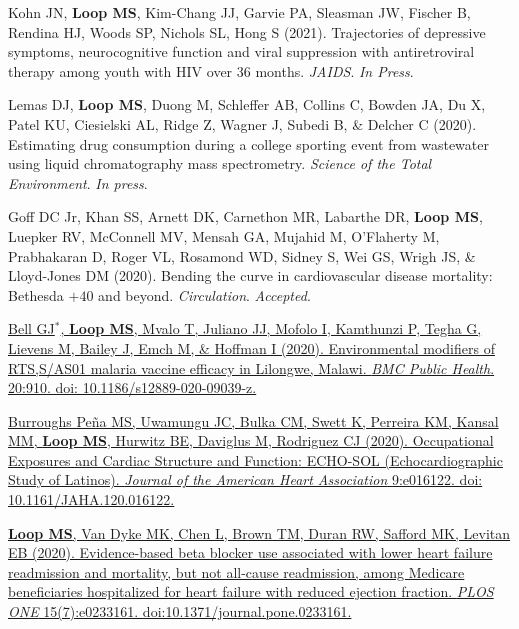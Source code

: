 \documentclass[10pt,letterpaper]{article}
\begin{document}
\begin{etaremune}

\item Kohn JN, \textbf{Loop MS}, Kim-Chang JJ, Garvie PA, Sleasman JW, Fischer B, Rendina HJ, Woods SP, Nichols SL, Hong S (2021). Trajectories of depressive symptoms, neurocognitive function and viral suppression with antiretroviral therapy among youth with HIV over 36 months. \emph{JAIDS}. \emph{In Press}.

\item Lemas DJ, \textbf{Loop MS}, Duong M, Schleffer AB, Collins C, Bowden JA, Du X, Patel KU, Ciesielski AL, Ridge Z, Wagner J, Subedi B, \& Delcher C (2020). Estimating drug consumption during a college sporting event from wastewater using liquid chromatography mass spectrometry. \emph{Science of the Total Environment}. \emph{In press}.

\item Goff DC Jr, Khan SS, Arnett DK, Carnethon MR, Labarthe DR, \textbf{Loop MS}, Luepker RV, McConnell MV, Mensah GA, Mujahid M, O'Flaherty M, Prabhakaran D, Roger VL, Rosamond WD, Sidney S, Wei GS, Wrigh JS, \& Lloyd-Jones DM (2020). Bending the curve in cardiovascular disease mortality: Bethesda $+40$ and beyond. \emph{Circulation}. \emph{Accepted}.

\item \href{https://bmcpublichealth.biomedcentral.com/articles/10.1186/s12889-020-09039-z}{Bell GJ$^*$, \textbf{Loop MS}, Mvalo T, Juliano JJ, Mofolo I, Kamthunzi P, Tegha G, Lievens M, Bailey J, Emch M, \& Hoffman I (2020). Environmental modifiers of RTS,S/AS01 malaria vaccine efficacy in Lilongwe, Malawi. \emph{BMC Public Health}. 20:910. doi: 10.1186/s12889-020-09039-z.}

\item \href{https://www.ahajournals.org/doi/pdf/10.1161/JAHA.120.016122}{Burroughs Pe\~{n}a MS, Uwamungu JC, Bulka CM, Swett K, Perreira KM, Kansal MM, \textbf{Loop MS}, Hurwitz BE, Daviglus M, Rodriguez CJ (2020). Occupational Exposures and Cardiac Structure and Function: ECHO-SOL (Echocardiographic Study of Latinos). \emph{Journal of the American Heart Association} 9:e016122. doi: 10.1161/JAHA.120.016122.}

\item \href{https://journals.plos.org/plosone/article?id=10.1371/journal.pone.0233161}{\textbf{Loop MS}, Van Dyke MK, Chen L, Brown TM, Duran RW, Safford MK, Levitan EB (2020). Evidence-based beta blocker use associated with lower heart failure readmission and mortality, but not all-cause readmission, among Medicare beneficiaries hospitalized for heart failure with reduced ejection fraction. \emph{PLOS ONE} 15(7):e0233161. doi:10.1371/journal.pone.0233161.}


\end{etaremune}
\end{document}
